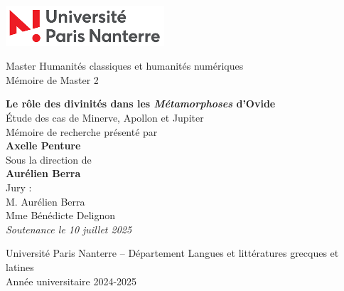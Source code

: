 \begin{titlepage}
    \noindent
    \begin{flushleft}
      \includegraphics[height=1.5cm]{logo-universite.png} 
    \end{flushleft}
    \vspace{1cm}
    
    \centering
    {\large Master Humanités classiques et humanités numériques\\[0.1cm]
    Mémoire de Master 2\\[1.2cm]}
    
    \Huge\textbf{Le rôle des divinités dans les \textit{Métamorphoses} d’Ovide}\\[0.4cm]
    \huge{Étude des cas de Minerve, Apollon et Jupiter}\\[1.5cm]
    
    \Large
    Mémoire de recherche présenté par\\
    \textbf{Axelle Penture}\\[0.5cm]
    
    Sous la direction de\\
    \textbf{Aurélien Berra}\\[1cm]

    {\large Jury :}\\[0.2cm]
    {\large
    M. Aurélien Berra\\[0.2 cm]
    Mme Bénédicte Delignon\\[0.5cm]
    \textit{Soutenance le 10 juillet 2025}\\[1cm]
    }

   \vfill
   {\large Université Paris Nanterre – Département Langues et littératures grecques et latines\\
   Année universitaire 2024-2025}
\end{titlepage}
